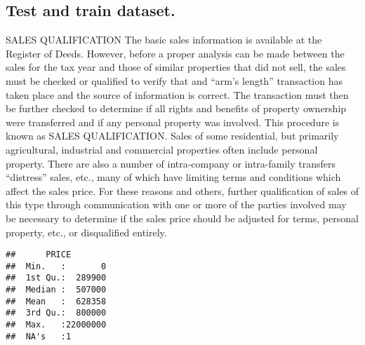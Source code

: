 \documentclass[]{article}
\newenvironment{Shaded}{\begin{snugshade}}{\end{snugshade}}
\newcommand{\CommentTok}[1]{\textcolor[rgb]{0.56,0.35,0.01}{\textit{#1}}}
\newcommand{\KeywordTok}[1]{\textcolor[rgb]{0.13,0.29,0.53}{\textbf{#1}}}
\newcommand{\NormalTok}[1]{#1}
\newcommand{\OperatorTok}[1]{\textcolor[rgb]{0.81,0.36,0.00}{\textbf{#1}}}
\newcommand{\StringTok}[1]{\textcolor[rgb]{0.31,0.60,0.02}{#1}}
\begin{document}
\hypertarget{test-and-train-dataset.}{%
\subsection{Test and train dataset.}\label{test-and-train-dataset.}}

SALES QUALIFICATION The basic sales information is available at the
Register of Deeds. However, before a proper analysis can be made between
the sales for the tax year and those of similar properties that did not
sell, the sales must be checked or qualified to verify that and ``arm's
length'' transaction has taken place and the source of information is
correct. The transaction must then be further checked to determine if
all rights and benefits of property ownership were transferred and if
any personal property was involved. This procedure is known as SALES
QUALIFICATION. Sales of some residential, but primarily agricultural,
industrial and commercial properties often include personal property.
There are also a number of intra-company or intra-family transfers
``distress'' sales, etc., many of which have limiting terms and
conditions which affect the sales price. For these reasons and others,
further qualification of sales of this type through communication with
one or more of the parties involved may be necessary to determine if the
sales price should be adjusted for terms, personal property, etc., or
disqualified entirely.

\begin{Shaded}
\end{Shaded}

\begin{verbatim}
##      PRICE         
##  Min.   :       0  
##  1st Qu.:  289900  
##  Median :  507000  
##  Mean   :  628358  
##  3rd Qu.:  800000  
##  Max.   :22000000  
##  NA's   :1
\end{verbatim}

\begin{Shaded}
\end{Shaded}
\end{document}
